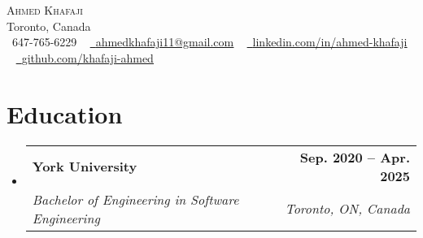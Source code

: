 \documentclass[letterpaper,11pt]{article}
\makeatletter
\newcommand{\resumeItem}[1]{
  \item\small{
    {#1 \vspace{-2pt}}
  }
}
\newcommand{\resumeSubheading}[4]{
  \vspace{-2pt}\item
    \begin{tabular*}{1.0\textwidth}[t]{l@{\extracolsep{\fill}}r}
      \textbf{#1} & \textbf{\small #2} \\
      \textit{\small#3} & \textit{\small #4} \\
    \end{tabular*}\vspace{-7pt}
}
\newcommand{\resumeSubHeadingListStart}{\begin{itemize}[leftmargin=0.0in, label={}]}
\newcommand{\resumeSubHeadingListEnd}{\end{itemize}}
\newcommand{\resumeItemListStart}{\begin{itemize}}
\newcommand{\resumeItemListEnd}{\end{itemize}\vspace{-5pt}}
\makeatother
\begin{document}
\begin{center}
    {\Huge \scshape Ahmed Khafaji} \\ \vspace{1pt}
    Toronto, Canada \\ \vspace{1pt}
    \small \raisebox{-0.1\height}\faPhone\ 647-765-6229 ~ 
    \href{mailto:ahmedkhafaji11@gmail.com}{\raisebox{-0.2\height}\faEnvelope\ \underline{ahmedkhafaji11@gmail.com}} ~ 
    \href{https://linkedin.com/in/ahmed-khafaji}{\raisebox{-0.2\height}\faLinkedin\ \underline{linkedin.com/in/ahmed-khafaji}}  ~
    \href{https://github.com/khafaji-ahmed}{\raisebox{-0.2\height}\faGithub\ \underline{github.com/khafaji-ahmed}}
    \vspace{-8pt}
\end{center}

\section{Education}
  \resumeSubHeadingListStart
    \resumeSubheading
      {York University}{Sep. 2020 -- Apr. 2025}
      {Bachelor of Engineering in Software Engineering}{Toronto, ON, Canada}
  \resumeSubHeadingListEnd

    
\end{document}

